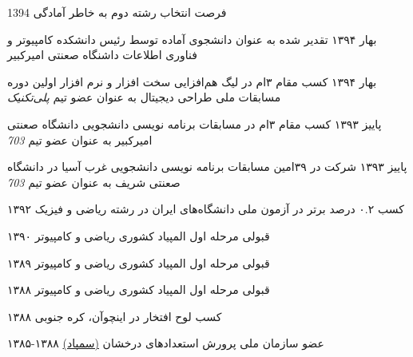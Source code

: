 \documentclass[]{friggeri-cv-fa} %
\begin{document}
\begin{entrylist}


\entry
{1394}
{{\normalfont فرصت انتخاب} \textcolor{TextGreen}{رشته دوم} {\normalfont به خاطر آمادگی}}
{}
{}


\entry
{بهار ۱۳۹۴}
{\normalfont تقدیر شده به عنوان دانشجوی آماده توسط رئیس دانشکده کامپیوتر و فناوری اطلاعات داشنگاه صعنتی امیرکبیر}
{}
{}


\entry
{بهار ۱۳۹۴}
{{\normalfont کسب مقام} \textcolor{TextYellow}{۳ام} {\normalfont در لیگ هم‌افزایی سخت افزار و نرم افزار اولین دوره مسابقات ملی طراحی دیجیتال به عنوان عضو تیم  \emph{پلی‌تکنیک}}}
{}
{}


\entry
{پاییز ۱۳۹۳}
{{\normalfont کسب مقام} \textcolor{UniBlue}{۳ام} {\normalfont در مسابقات برنامه نویسی دانشجویی دانشگاه صعنتی امیرکبیر به عنوان عضو تیم   \emph{703}}}
{}
{}


\entry
{پاییز ۱۳۹۳}
{\normalfont شرکت در ۳۹امین مسابقات برنامه نویسی دانشجویی غرب آسیا در دانشگاه صعنتی شریف به عنوان عضو تیم  \emph{703}}
{}
{}


\entry
{۱۳۹۲}
{\normalfont کسب ۰.۲ درصد برتر در آزمون ملی دانشگاه‌های ایران در رشته ریاضی و فیزیک}
{}
{}


\entry
{۱۳۹۰}
{{\normalfont قبولی} \textcolor{TextOrange}{مرحله اول} {\normalfont المپیاد کشوری ریاضی و کامپیوتر}}
{}
{}


\entry
{۱۳۸۹}
{{\normalfont قبولی} \textcolor{TextOrange}{مرحله اول} {\normalfont المپیاد کشوری ریاضی و کامپیوتر}}
{}
{}


\entry
{۱۳۸۸}
{{\normalfont قبولی} \textcolor{TextOrange}{مرحله اول} {\normalfont المپیاد کشوری ریاضی و کامپیوتر}}
{}
{}


\entry
{۱۳۸۸}
{{\normalfont کسب} \textcolor{Ocean}{لوح افتخار} {\normalfont در 
اینچوآن، کره جنوبی}}
{}
{}


\entry
{۱۳۸۵-۱۳۸۸}
{\normalfont عضو سازمان ملی پرورش استعداد‌های درخشان \href{https://en.wikipedia.org/wiki/National_Organization_for_Development_of_Exceptional_Talents}{(سمپاد)}}
{}
{}


\end{entrylist}
\end{document}
